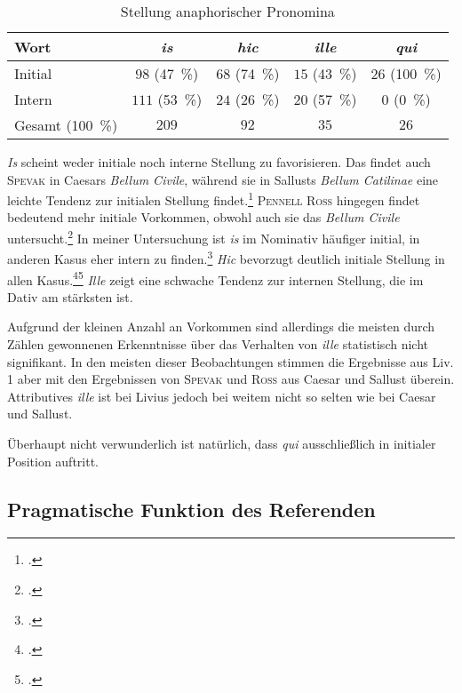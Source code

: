 \documentclass[12pt]{article}
\newcommand{\lat}[1]{\textit{#1}} %
\begin{document}
\begin{table}[h]
  \centering
  \begin{tabular}{lcccc}
	\toprule
	Wort & \lat{is} & \lat{hic} &\lat{ille} & \lat{qui}\\
	\midrule
	Initial & $98$ (\SI{47}{\%}) & $68$ (\SI{74}{\%}) & $15$ (\SI{43}{\%}) & $26$ (\SI{100}{\%})\\
	Intern & $111$ (\SI{53}{\%}) & $24$ (\SI{26}{\%}) & $20$ (\SI{57}{\%}) & $0$ (\SI{0}{\%})\\
	Gesamt (\SI{100}{\%}) & $209$ & $92$ & $35$ & $26$\\
	\bottomrule
  \end{tabular}
  \caption{Stellung anaphorischer Pronomina}
  \label{stellanaph}
\end{table}

\noindent \lat{Is} scheint weder initiale noch interne Stellung zu favorisieren. Das findet auch \textsc{Spevak} in Caesars \lat{Bellum Civile}, während sie in Sallusts \lat{Bellum Catilinae} eine leichte Tendenz zur initialen Stellung findet.\footcite[S.\,75]{spevak}
\textsc{Pennell Ross} hingegen findet bedeutend mehr initiale Vorkommen, obwohl auch sie das \lat{Bellum Civile} untersucht.\footcite[hier S.\, 514f. \textsc{Pennell Ross} untersucht nur substantivische Vorkommen, während \textsc{Spevak} auch adjektivische Vorkommen zählt. Trotzdem ist die Diskrepanz an einigen Stellen zu groß, um nur dadurch erklärt zu werden.]{ross96} 
In meiner Untersuchung ist \lat{is} im Nominativ häufiger initial, in anderen Kasus eher intern zu finden.\footcite[Vgl.][S.\,75]{spevak}
\lat{Hic} bevorzugt deutlich initiale Stellung in allen Kasus.\footcite[Vgl.][S.\,75]{spevak}\footcite[Vgl.][hier S.\,514f.]{ross96}
\lat{Ille} zeigt eine schwache Tendenz zur internen Stellung, die im Dativ am stärksten ist.

Aufgrund der kleinen Anzahl an Vorkommen sind allerdings die meisten durch Zählen gewonnenen Erkenntnisse über das Verhalten von \lat{ille} statistisch nicht signifikant.
In den meisten dieser Beobachtungen stimmen die Ergebnisse aus Liv. 1 aber mit den Ergebnissen von \textsc{Spevak} und \textsc{Ross} aus Caesar und Sallust überein.
Attributives \lat{ille} ist bei Livius jedoch bei weitem nicht so selten wie bei Caesar und Sallust.

Überhaupt nicht verwunderlich ist natürlich, dass \lat{qui} ausschließlich in initialer Position auftritt.


\subsection{Pragmatische Funktion des Referenden}
\label{referend}
\end{document}

